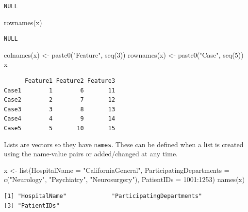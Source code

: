 \documentclass[
]{book}
\newenvironment{Shaded}{\begin{snugshade}}{\end{snugshade}}
\newcommand{\AttributeTok}[1]{\textcolor[rgb]{0.77,0.63,0.00}{#1}}
\newcommand{\DecValTok}[1]{\textcolor[rgb]{0.00,0.00,0.81}{#1}}
\newcommand{\FunctionTok}[1]{\textcolor[rgb]{0.00,0.00,0.00}{#1}}
\newcommand{\NormalTok}[1]{#1}
\newcommand{\OtherTok}[1]{\textcolor[rgb]{0.56,0.35,0.01}{#1}}
\newcommand{\SpecialCharTok}[1]{\textcolor[rgb]{0.00,0.00,0.00}{#1}}
\newcommand{\StringTok}[1]{\textcolor[rgb]{0.31,0.60,0.02}{#1}}
\begin{document}
\begin{verbatim}
NULL
\end{verbatim}

\begin{Shaded}
\begin{Highlighting}[]
\FunctionTok{rownames}\NormalTok{(x)}
\end{Highlighting}
\end{Shaded}

\begin{verbatim}
NULL
\end{verbatim}

\begin{Shaded}
\begin{Highlighting}[]
\FunctionTok{colnames}\NormalTok{(x) }\OtherTok{\textless{}{-}} \FunctionTok{paste0}\NormalTok{(}\StringTok{"Feature"}\NormalTok{, }\FunctionTok{seq}\NormalTok{(}\DecValTok{3}\NormalTok{))}
\FunctionTok{rownames}\NormalTok{(x) }\OtherTok{\textless{}{-}} \FunctionTok{paste0}\NormalTok{(}\StringTok{"Case"}\NormalTok{, }\FunctionTok{seq}\NormalTok{(}\DecValTok{5}\NormalTok{))}
\NormalTok{x}
\end{Highlighting}
\end{Shaded}

\begin{verbatim}
      Feature1 Feature2 Feature3
Case1        1        6       11
Case2        2        7       12
Case3        3        8       13
Case4        4        9       14
Case5        5       10       15
\end{verbatim}

Lists are vectors so they have \texttt{names}. These can be defined when a list is created using the name-value pairs or added/changed at any time.

\begin{Shaded}
\begin{Highlighting}[]
\NormalTok{x }\OtherTok{\textless{}{-}} \FunctionTok{list}\NormalTok{(}\AttributeTok{HospitalName =} \StringTok{"CaliforniaGeneral"}\NormalTok{,}
          \AttributeTok{ParticipatingDepartments =} \FunctionTok{c}\NormalTok{(}\StringTok{"Neurology"}\NormalTok{, }\StringTok{"Psychiatry"}\NormalTok{, }\StringTok{"Neurosurgery"}\NormalTok{),}
          \AttributeTok{PatientIDs =} \DecValTok{1001}\SpecialCharTok{:}\DecValTok{1253}\NormalTok{)}
\FunctionTok{names}\NormalTok{(x)}
\end{Highlighting}
\end{Shaded}

\begin{verbatim}
[1] "HospitalName"             "ParticipatingDepartments"
[3] "PatientIDs"              
\end{verbatim}
\end{document}
